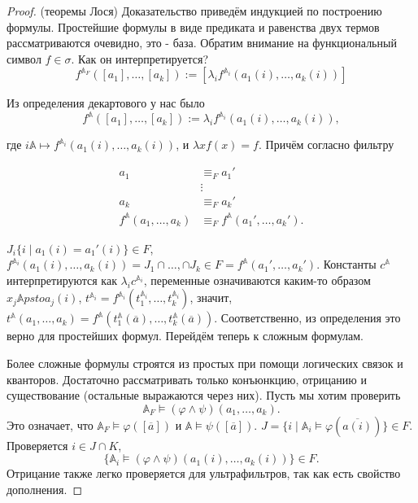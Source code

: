 \begin{proof} (теоремы Лося)
    Доказательство приведём индукцией по построению формулы. Простейшие формулы в виде предиката и равенства двух термов рассматриваются очевидно, это - база. Обратим внимание на функциональный символ $f \in \sigma$. Как он интерпретируется? $$f^{\mathbb{A}_F}([a_1], \ldots, [a_k]):= [\lambda_i f^{\mathbb{A}_i}(a_1(i), \ldots, a_k(i))]$$ 

    Из определения декартового у нас было $$f^{\mathbb{A}}([a_1], \ldots, [a_k]):= \lambda_i f^{\mathbb{A}_i}(a_1(i), \ldots, a_k(i)),$$ 

    где $i \mathbb{A}\mapsto f^{\mathbb{A}_i}(a_1(i), \ldots, a_k(i))$, и $\lambda x f(x) = f$. Причём согласно фильтру 

    \begin{equation*}
        \begin{aligned}
            a_1 &\equiv_F a_1' \\ 
            &\vdots \\ 
            a_k &\equiv_F a_k' \\ 
            f^{\mathbb{A}}(a_1, \ldots, a_k) &\equiv_F f^{\mathbb{A}}(a_1', \ldots, a_k').
        \end{aligned}
    \end{equation*} 

    $J_i \{i\mid a_1(i) = a_1'(i)\} \in F$, $f^{\mathbb{A}_i}(a_1(i), \ldots, a_k(i)) = J_1 \cap \ldots, \cap J_k \in F = f^{\mathbb{A}}(a_1', \ldots, a_k')$. Константы $c^{\mathbb{A}}$ интерпретируются как $\lambda_i c^{\mathbb{A}_i}$, переменные означиваются каким-то образом $x_j \mathbb{A}psto a_j(i)$, $t^{\mathbb{A}_i} = f^{\mathbb{A}_i}(t_1^{\mathbb{A}_i}, \ldots, t_k^{\mathbb{A}_i})$, значит, $t^{\mathbb{A}}(a_1, \ldots, a_k) = f^{\mathbb{A}}(t_1^{\mathbb{A}}(\overline{a}), \ldots, t_k^{\mathbb{A}}(\overline{a}))$. Соответственно, из определения это верно для простейших формул. Перейдём теперь к сложным формулам. \ 
    
    Более сложные формулы строятся из простых при помощи логических связок и кванторов. Достаточно рассматривать только конъюнкцию, отрицанию и существование (остальные выражаются через них). Пусть мы хотим проверить $$\mathbb{A}_F \models (\varphi \wedge \psi)(a_1, \ldots, a_k).$$ Это означает, что $\mathbb{A}_F \models \varphi([\overline{a}])$ и $\mathbb{A} \models \psi ([\overline{a}])$. $J = \{i \mid \mathbb{A}_i \models \varphi(\overline{a(i)})\} \in F$. Проверяется $i \in J \cap K$, $$\{\mathbb{A}_i \models (\varphi \wedge \psi)(a_1(i), \ldots, a_k(i))\} \in F.$$ Отрицание также легко проверяется для ультрафильтров, так как есть свойство дополнения. 


\end{proof}
